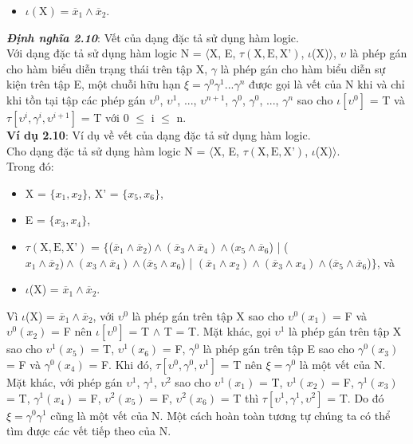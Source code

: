 \documentclass[a4paper,13pt,oneside,openany]{book}
\begin{document}
\begin{flushleft}
\begin{itemize}
			\item $\iota(\textrm{X}) = \overline{x}_1 \land \overline{x}_2$.
		\end{itemize}
		\textbf{\textit{Định nghĩa 2.10}}: Vết của dạng đặc tả sử dụng hàm logic.\\
		Với dạng đặc tả sử dụng hàm logic N = $\langle$X, E, $\tau(\textrm{X}, \textrm{E}, \textrm{X'})$, $\iota$(X)$\rangle$, $\upsilon$ là phép gán cho hàm biểu diễn trạng thái trên tập X, $\gamma$ là phép gán cho hàm biểu diễn sự kiện trên tập E, một chuỗi hữu hạn $\xi = \gamma^0\gamma^1...\gamma^n$ được gọi là vết của N khi và chỉ khi tồn tại tập các phép gán $\upsilon^0$, $\upsilon^1$, ..., $\upsilon^{n+1}$, $\gamma^0$, $\gamma^0$, ..., $\gamma^n$ sao cho $\iota[\upsilon^0]$ = T và $\tau[\upsilon^i, \gamma^i, \upsilon^{i+1}]$ = T với 0 $\leq$ i $\leq$ n.\\
		\textbf{Ví dụ 2.10}: Ví dụ về vết của dạng đặc tả sử dụng hàm logic.\\
		Cho dạng đặc tả sử dụng hàm logic N = $\langle$X, E, $\tau(\textrm{X}, \textrm{E}, \textrm{X'})$, $\iota$(X)$\rangle$.\\
		Trong đó:
		\begin{itemize}
			\item X = $\{x_1, x_2\}$, X' = $\{x_5, x_6\}$,
			\item E = $\{x_3, x_4\}$,
			\item $\tau(\textrm{X}, \textrm{E}, \textrm{X'})$ = $\{$($\overline{x}_1 \land \overline{x}_2) \land (\overline{x}_3 \land \overline{x}_4) \land (x_5 \land \overline{x}_6$) | ($x_1\land\overline{x}_2)\land (x_3\land \overline{x}_4)\land (\overline{x}_5 \land x_6$) | $(\overline{x}_1\land x_2)\land(\overline{x}_3\land x_4)\land (\overline{x}_5\land\overline{x}_6$)$\}$, và
			\item $\iota$(X) = $\overline{x}_1 \land \overline{x}_2$.
		\end{itemize}
		Vì $\iota$(X) = $\overline{x}_1 \land \overline{x}_2$, với $\upsilon^0$ là phép gán trên tập X sao cho $\upsilon^0(x_1)$ = F và $\upsilon^0(x_2)$ = F nên $\iota[\upsilon^0]$ = T $\land$ T = T. Mặt khác, gọi $\upsilon^1$ là phép gán trên tập X sao cho $\upsilon^1(x_5)$ = T, $\upsilon^1(x_6)$ = F, $\gamma^0$ là phép gán trên tập E sao cho $\gamma^0(x_3)$ = F và $\gamma^0(x_4)$ = F. Khi đó, $\tau[\upsilon^0, \gamma^0, \upsilon^1]$ = T nên $\xi = \gamma^0$ là một vết của N.
		Mặt khác, với phép gán $\upsilon^1$, $\gamma^1$,  $\upsilon^2$ sao cho $\upsilon^1(x_1)$ = T, $\upsilon^1(x_2)$ = F, $\gamma^1(x_3)$ = T, $\gamma^1(x_4)$ = F, $\upsilon^2(x_5)$ = F,  $\upsilon^2(x_6)$ = T thì $\tau[\upsilon^1, \gamma^1, \upsilon^2]$ = T. Do đó $\xi = \gamma^0\gamma^1$ cũng là một vết của N. Một cách hoàn toàn tương tự chúng ta có thể tìm được các vết tiếp theo của N.\\

\end{flushleft}
\end{document}
